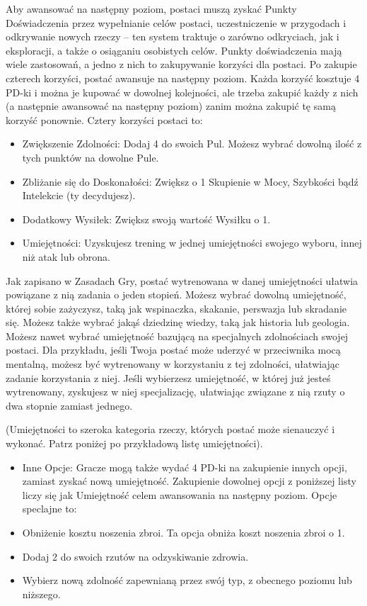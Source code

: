 Aby awansować na następny poziom, postaci muszą zyskać Punkty Doświadczenia przez wypełnianie celów postaci, uczestniczenie w przygodach i odkrywanie nowych rzeczy – ten system traktuje o zarówno odkryciach, jak i eksploracji, a także o osiąganiu osobistych celów. Punkty doświadczenia mają wiele zastosowań, a jedno z nich to zakupywanie korzyści dla postaci. Po zakupie czterech korzyści, postać awansuje na następny poziom. Każda korzyść kosztuje 4 PD-ki i można je kupować w dowolnej kolejności, ale trzeba zakupić każdy z nich (a następnie awansować na następny poziom) zanim można zakupić tę samą korzyść ponownie. Cztery korzyści postaci to:

\begin{itemize}
    \item Zwiększenie Zdolności: Dodaj 4 do swoich Pul. Możesz wybrać dowolną ilość z tych punktów na dowolne Pule.
    \item Zbliżanie się do Doskonałości: Zwiększ o 1 Skupienie w Mocy, Szybkości bądź Intelekcie (ty decydujesz).
    \item Dodatkowy Wysiłek: Zwiększ swoją wartość Wysiłku o 1.
    \item Umiejętności: Uzyskujesz trening w jednej umiejętności swojego wyboru, innej niż atak lub obrona. 
\end{itemize}    

Jak zapisano w Zasadach Gry, postać wytrenowana w danej umiejętności ułatwia powiązane z nią zadania o jeden stopień. Możesz wybrać dowolną umiejętność, której sobie zażyczysz, taką jak wspinaczka, skakanie, perswazja lub skradanie się. Możesz także wybrać jakąś dziedzinę wiedzy, taką jak historia lub geologia. Możesz nawet wybrać umiejętność bazującą na specjalnych zdolnościach swojej postaci. Dla przykładu, jeśli Twoja postać może uderzyć w przeciwnika mocą mentalną, możesz być wytrenowany w korzystaniu z tej zdolności, ułatwiając zadanie korzystania z niej. Jeśli wybierzesz umiejętność, w której już jesteś wytrenowany, zyskujesz w niej specjalizację, ułatwiając związane z nią rzuty o dwa stopnie zamiast jednego.

(Umiejętności to szeroka kategoria rzeczy, których postać może sienauczyć i wykonać. Patrz poniżej po przykładową listę umiejętności).

\begin{itemize}
        \item Inne Opcje: Gracze mogą także wydać 4 PD-ki na zakupienie innych opcji, zamiast zyskać nową umiejętność. Zakupienie dowolnej opcji z poniższej listy liczy się jak Umiejętność celem awansowania na następny poziom. Opcje speclajne to:
        \item Obniżenie kosztu noszenia zbroi. Ta opcja obniża koszt noszenia zbroi o 1.
        \item Dodaj 2 do swoich rzutów na odzyskiwanie zdrowia. 
        \item Wybierz nową zdolność zapewnianą przez swój typ, z obecnego poziomu lub niższego.
\end{itemize}

